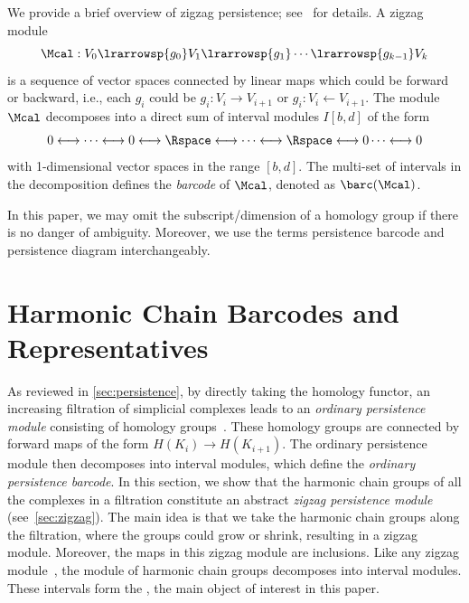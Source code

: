 We provide a brief overview of zigzag persistence; see~\cite{CarlssonSilva2010,CarlssonSilvaMorozov2009} for details.
A zigzag module 
\[\Mcal:V_0\lrarrowsp{g_0}V_1\lrarrowsp{g_1}\cdots\lrarrowsp{g_{k-1}}V_k\]
is a sequence of vector spaces connected by linear maps which could be forward or backward,
i.e., each $g_i$ could be $g_i:V_i\to V_{i+1}$ or $g_i:V_{i}\leftarrow V_{i+1}$.
The module $\Mcal$ decomposes into a direct sum of interval modules $I[b,d]$ of the form 
\[0 \longleftrightarrow \cdots \longleftrightarrow 0 \longleftrightarrow \Rspace \longleftrightarrow \cdots \longleftrightarrow \Rspace \longleftrightarrow 0 \cdots \longleftrightarrow 0 \]
with 1-dimensional vector spaces in the range $[b,d]$. 
The multi-set of intervals in the decomposition
defines the \emph{barcode} of $\Mcal$, denoted as $\barc(\Mcal)$.

In this paper, we may omit the subscript/dimension of a homology group if there is no danger of ambiguity. Moreover, we use the terms persistence barcode and persistence diagram interchangeably. 



\section{Harmonic Chain Barcodes and Representatives}
\label{sec:barcode-zigzag}

As reviewed in \cref{sec:persistence}, by directly taking the homology functor, an increasing filtration of simplicial complexes leads to an \emph{ordinary persistence module} consisting of homology groups~\cite{chazal2016structure,DeyWang2022}. These homology groups are connected by forward maps of the form $H(K_i) \xrightarrow{} H(K_{i+1})$. The ordinary persistence module then decomposes into interval  modules, which define the \emph{ordinary persistence barcode}. 
In this section, we show that the harmonic chain groups of all the complexes in a filtration constitute an abstract \emph{zigzag persistence module}  (see~\cref{sec:zigzag}). 
The main idea is that we take the harmonic chain groups along the filtration, where the groups could grow or shrink, resulting in a zigzag module. 
Moreover, the maps in this zigzag module are inclusions. 
Like any zigzag module~\cite{CarlssonSilva2010}, the module of harmonic chain groups decomposes into interval modules. These intervals form the {\hcd}, the main object of interest in this paper. 

